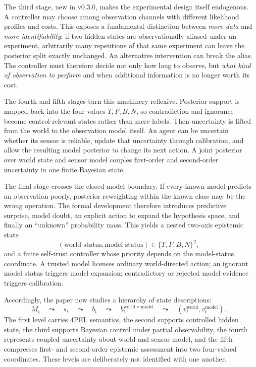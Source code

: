 The third stage, new in v0.3.0, makes the experimental design itself endogenous. A controller may choose among observation channels with different likelihood profiles and costs. This exposes a fundamental distinction between \emph{more data} and \emph{more identifiability}: if two hidden states are observationally aliased under an experiment, arbitrarily many repetitions of that same experiment can leave the posterior split exactly unchanged. An alternative intervention can break the alias. The controller must therefore decide not only how long to observe, but \emph{what kind of observation to perform} and when additional information is no longer worth its cost.

The fourth and fifth stages turn this machinery reflexive. Posterior support is mapped back into the four values $T,F,B,N$, so contradiction and ignorance become control-relevant states rather than mere labels. Then uncertainty is lifted from the world to the observation model itself. An agent can be uncertain whether its sensor is reliable, update that uncertainty through calibration, and allow the resulting model posterior to change its next action. A joint posterior over world state and sensor model couples first-order and second-order uncertainty in one finite Bayesian state.

The final stage crosses the closed-model boundary. If every known model predicts an observation poorly, posterior reweighting within the known class may be the wrong operation. The formal development therefore introduces predictive surprise, model doubt, an explicit action to expand the hypothesis space, and finally an ``unknown'' probability mass. This yields a nested two-axis epistemic state
\[
  (\text{world status},\text{model status}) \in \{T,F,B,N\}^2,
\]
and a finite self-trust controller whose priority depends on the model-status coordinate. A trusted model licenses ordinary world-directed action; an ignorant model status triggers model expansion; contradictory or rejected model evidence triggers calibration.

Accordingly, the paper now studies a hierarchy of state descriptions:
\[
M_t
\quad\leadsto\quad
s_t
\quad\leadsto\quad
b_t
\quad\leadsto\quad
b_t^{\mathrm{world}\times\mathrm{model}}
\quad\leadsto\quad
(v^{\mathrm{world}}_t,v^{\mathrm{model}}_t).
\]
The first level carries 4PEL semantics, the second supports controlled hidden state, the third supports Bayesian control under partial observability, the fourth represents coupled uncertainty about world and sensor model, and the fifth compresses first- and second-order epistemic assessment into two four-valued coordinates. These levels are deliberately not identified with one another.

